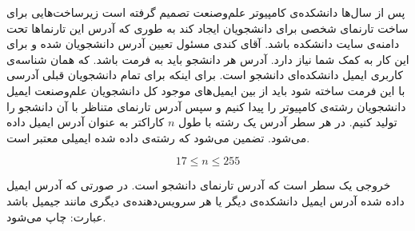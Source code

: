 \gdef\thisproblemauthor{\rl{علی حیدری}}
\begin{problem}{}
{}{}
{}{}{}
پس از سال‌ها دانشکده‌ی کامپیوتر علم‌وصنعت تصمیم گرفته است زیرساخت‌هایی برای ساخت تارنمای شخصی برای دانشجویان ایجاد کند به طوری که آدرس این تارنماها تحت دامنه‌ی سایت دانشکده باشد. آقای کندی مسئول تعیین آدرس دانشجویان شده و برای این کار به کمک شما نیاز دارد. آدرس هر دانشجو باید به فرمت
\colorbox{gray!10}{}
  باشد. که
\colorbox{gray!10}{}
    همان شناسه‌ی کاربری ایمیل دانشکده‌ای دانشجو است. برای اینکه برای تمام دانشجویان قبلی آدرسی با این فرمت ساخته شود باید از بین ایمیل‌های موجود کل دانشجویان علم‌و‌صنعت ایمیل دانشجویان رشته‌ی کامپیوتر را پیدا کنیم و سپس آدرس تارنمای متناظر با آن دانشجو را تولید کنیم.
    \InputFile
 در هر سطر آدرس یک رشته با طول $n$ کاراکتر به عنوان آدرس ایمیل داده می‌شود. تضمین می‌شود که رشته‌ی داده شده ایمیلی معتبر است.

    $$ 17 \le n \le 255 $$


    \OutputFile

خروجی یک سطر است که آدرس تارنمای دانشجو است. در صورتی که آدرس ایمیل داده شده  آدرس ایمیل دانشکده‌ی دیگر یا هر سرویس‌دهنده‌ی دیگری مانند جیمیل باشد عبارت:
\colorbox{gray!10}{}
چاپ می‌شود.
    \Examples


%
%


\end{problem}
